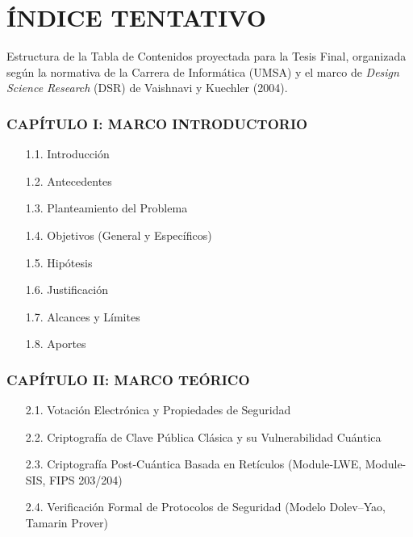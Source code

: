 \section{ÍNDICE TENTATIVO}

Estructura de la Tabla de Contenidos proyectada para la Tesis Final, organizada según la normativa de la Carrera de Informática (UMSA) y el marco de \textit{Design Science Research} (DSR) de Vaishnavi y Kuechler (2004).

\begingroup
\renewcommand{\baselinestretch}{0.95}\selectfont
\footnotesize
{}

\subsubsection*{CAPÍTULO I: MARCO INTRODUCTORIO}
\begin{itemize}
	\item[1.1.] Introducción
	\item[1.2.] Antecedentes
	\item[1.3.] Planteamiento del Problema
	\item[1.4.] Objetivos (General y Específicos)
	\item[1.5.] Hipótesis
	\item[1.6.] Justificación
	\item[1.7.] Alcances y Límites
	\item[1.8.] Aportes
\end{itemize}

\subsubsection*{CAPÍTULO II: MARCO TEÓRICO}
\begin{itemize}
	\item[2.1.] Votación Electrónica y Propiedades de Seguridad
	\item[2.2.] Criptografía de Clave Pública Clásica y su Vulnerabilidad Cuántica
	\item[2.3.] Criptografía Post-Cuántica Basada en Retículos (Module-LWE, Module-SIS, FIPS 203/204)
	\item[2.4.] Verificación Formal de Protocolos de Seguridad (Modelo Dolev--Yao, Tamarin Prover)
\end{itemize}

